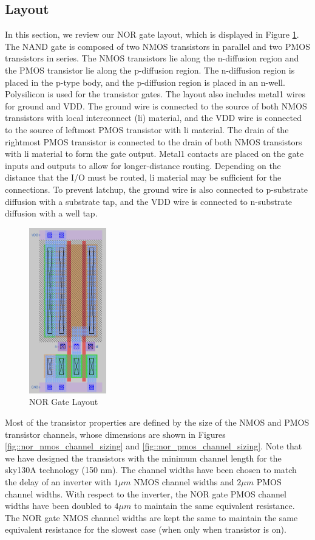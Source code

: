\documentclass{article}
\begin{document}
	\subsection{Layout}
	
	In this section, we review our NOR gate layout, which is displayed in Figure \ref{fig::nor_layout}. The NAND gate is composed of two NMOS transistors in parallel and two PMOS transistors in series. The NMOS transistors lie along the n-diffusion region and the PMOS transistor lie along the p-diffusion region. The n-diffusion region is placed in the p-type body, and the p-diffusion region is placed in an n-well. Polysilicon is used for the transistor gates. The layout also includes metal1 wires for ground and VDD. The ground wire is connected to the source of both NMOS transistors with local interconnect (li) material, and the VDD wire is connected to the source of leftmost PMOS transistor with li material. The drain of the rightmost PMOS transistor is connected to the drain of both NMOS transistors with li material to form the gate output. Metal1 contacts are placed on the gate inputs and outputs to allow for longer-distance routing. Depending on the distance that the I/O must be routed, li material may be sufficient for the connections. To prevent latchup, the ground wire is also connected to p-substrate diffusion with a substrate tap, and the VDD wire is connected to n-substrate diffusion with a well tap.
	
	\begin{figure}[H]
		\centerline{\includegraphics[width=0.3\textwidth]{nor_layout.png}}
		\caption{NOR Gate Layout}
		\label{fig::nor_layout}
	\end{figure}
	
	Most of the transistor properties are defined by the size of the NMOS and PMOS transistor channels, whose dimensions are shown in Figures \ref{fig::nor_nmos_channel_sizing} and \ref{fig::nor_pmos_channel_sizing}. Note that we have designed the transistors with the minimum channel length for the sky130A technology (150 nm). The channel widths have been chosen to match the delay of an inverter with $1 {\mu}m$ NMOS channel widths and $2 {\mu}m$ PMOS channel widths. With respect to the inverter, the NOR gate PMOS channel widths have been doubled to $4 {\mu}m$ to maintain the same equivalent resistance. The NOR gate NMOS channel widths are kept the same to maintain the same equivalent resistance for the slowest case (when only when transistor is on).
	
\end{document}
